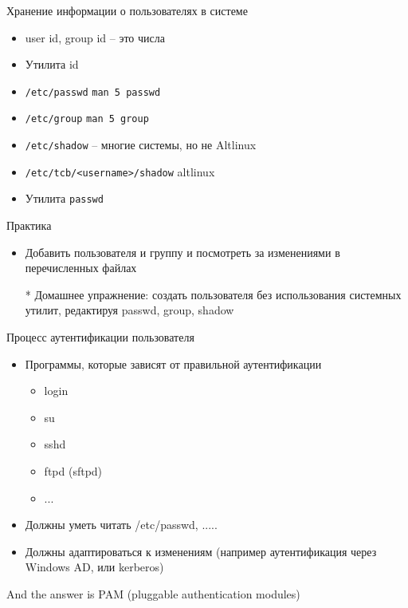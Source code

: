 \documentclass[ignorenonframetext, professionalfonts, hyperref={pdftex, unicode}]{beamer}
\begin{document}
\begin{frame}{Хранение информации о пользователях в системе}
  \begin{itemize}
    \item user id, group id -- это числа
    \item Утилита id 
    \item {\tt /etc/passwd} {\tt man 5 passwd}
    \item {\tt /etc/group}  {\tt man 5 group}
    \item {\tt /etc/shadow} -- многие системы, но не Altlinux
    \item {\tt /etc/tcb/<username>/shadow} altlinux
    \item Утилита {\tt passwd}
  \end{itemize}
  \pause
  \begin{block}{Практика}
    \begin{itemize}
       \item Добавить пользователя и группу и посмотреть за изменениями в перечисленных файлах
       \item[*] Домашнее упражнение: создать пользователя без использования системных утилит, редактируя passwd, group, shadow
    \end{itemize}
  \end{block}
\end{frame}


\begin{frame}{Процесс аутентификации пользователя}
  \begin{itemize}
    \item Программы, которые зависят от правильной аутентификации
      \begin{itemize}
        \item login
        \item su
        \item sshd
        \item ftpd (sftpd)
        \item ...
      \end{itemize}
    \item Должны уметь читать /etc/passwd, .....
    \item Должны адаптироваться к изменениям (например аутентификация через Windows AD, или kerberos)
   \end{itemize}
   \pause
   \begin{center}
      And the answer is \pause PAM (pluggable authentication modules)  
   \end{center}
\end{frame}
\end{document}
